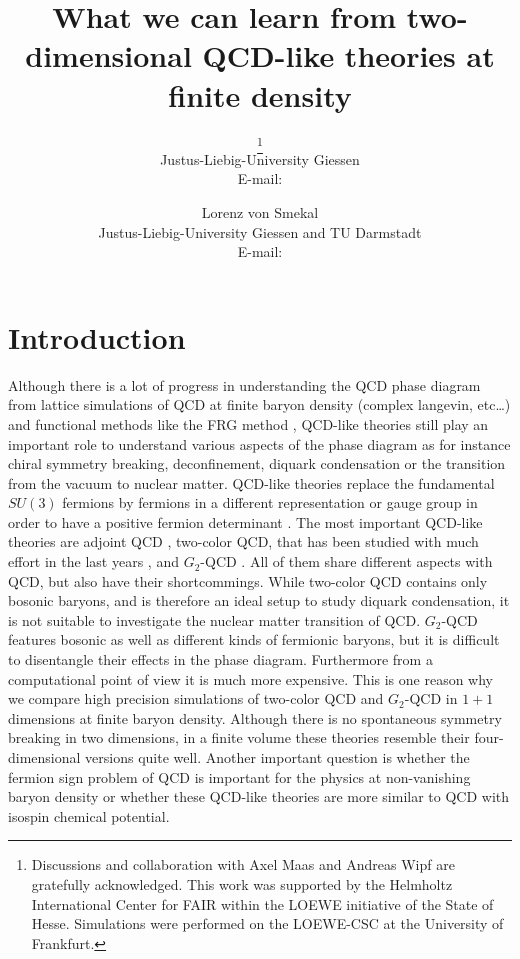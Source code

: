 \documentclass{PoS}
\title{What we can learn from two-dimensional QCD-like theories at finite density}
\author{\speaker{Bj\"orn H. Wellegehausen}\thanks{Discussions and collaboration with Axel Maas and Andreas Wipf are gratefully acknowledged. 
This work was supported by the Helmholtz International Center for FAIR within the LOEWE initiative of the State of Hesse.
Simulations were performed on the LOEWE-CSC at the University of Frankfurt.}\\%
        Justus-Liebig-University Giessen\\
        E-mail: \email{bjoern.wellegehausen@theo.physik.uni-giessen.de}}
\author{Lorenz von Smekal\\%
        Justus-Liebig-University Giessen and TU Darmstadt\\
        E-mail: \email{lorenz.smekal@physik.tu-darmstadt.de}}
\begin{document}
\section{Introduction}
\noindent

Although there is a lot of progress in understanding the QCD phase diagram from lattice simulations of QCD at finite baryon density (complex langevin, etc\dots) \cite{Aarts:2016qrv} and functional methods like the FRG method \cite{Braun:2009gm}, 
QCD-like theories still play an important role to understand various aspects of the phase diagram as for instance chiral symmetry breaking, deconfinement, diquark condensation or the transition from the vacuum to nuclear matter.
QCD-like theories replace the fundamental $SU(3)$ fermions by fermions in a different representation or gauge group in order to have a positive fermion determinant \cite{Kogut:2000ek}. 
The most important QCD-like theories are adjoint QCD \cite{Bilgici:2009jy}, two-color QCD, that has been studied with much effort in the last years \cite{Cotter:2012mb,Holicki:2017psk}, and $G_2$-QCD \cite{Wellegehausen:2015iea}. All of them share different aspects with QCD, but also have their shortcommings.
While two-color QCD contains only bosonic baryons, and is therefore an ideal setup to study diquark condensation, it is not suitable to investigate the nuclear matter transition of QCD. $G_2$-QCD features bosonic as well as different
kinds of fermionic baryons, but it is difficult to disentangle their effects in the phase diagram. 
Furthermore from a computational point of view it is much more expensive. This is one reason why we compare high precision simulations of two-color QCD and $G_2$-QCD in $1+1$ dimensions at finite baryon density. 
Although there is no spontaneous symmetry breaking in two dimensions, in a finite volume these theories
resemble their four-dimensional versions quite well. 
Another important question is whether the fermion sign problem of QCD is important for the physics at non-vanishing baryon density
or whether these QCD-like theories are more similar to QCD with isospin chemical potential.
\end{document}
